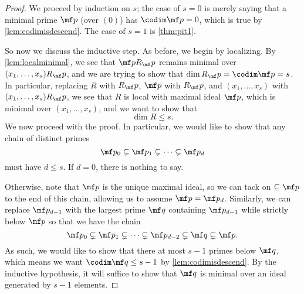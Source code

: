 \begin{proof}
	We proceed by induction on $s$; the case of $s=0$ is merely saying that a minimal prime $\mf p$ (over $(0)$) has $\codim\mf p=0$, which is true by \autoref{lem:codimisdescend}. The case of $s=1$ is \autoref{thm:pit1}.
	
	So now we discuss the inductive step. As before, we begin by localizing. By \autoref{lem:localminimal}, we see that $\mf pR_\mf p$ remains minimal over $(x_1,\ldots,x_s)R_\mf p$, and we are trying to show that $\dim R_\mf p=\codim\mf p=s$. In particular, replacing $R$ with $R_\mf p$, $\mf p$ with $R_\mf p$, and $(x_1,\ldots,x_s)$ with $(x_1,\ldots,x_s)R_\mf p$, we see that $R$ is local with maximal ideal $\mf p$, which is minimal over $(x_1,\ldots,x_s)$, and we want to show that
	\[\dim R\le s.\]
	We now proceed with the proof. In particular, we would like to show that any chain of distinct primes
	\[\mf p_0\subsetneq\mf p_1\subsetneq\cdots\subsetneq\mf p_d\]
	must have $d\le s$. If $d=0$, there is nothing to say.
	
	Otherwise, note that $\mf p$ is the unique maximal ideal, so we can tack on $\subseteq\mf p$ to the end of this chain, allowing us to assume $\mf p=\mf p_d$. Similarly, we can replace $\mf p_{d-1}$ with the largest prime $\mf q$ containing $\mf p_{d-1}$ while strictly below $\mf p$ so that we have the chain
	\[\mf p_0\subsetneq\mf p_1\subsetneq\cdots\subsetneq\mf p_{d-2}\subsetneq\mf q\subsetneq\mf p.\]
	As such, we would like to show that there at most $s-1$ primes below $\mf q$, which means we want $\codim\mf q\le s-1$ by \autoref{lem:codimisdescend}. By the inductive hypothesis, it will suffice to show that $\mf q$ is minimal over an ideal generated by $s-1$ elements.


\end{proof}
